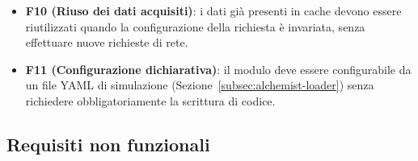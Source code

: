 \begin{itemize}
    \item \textbf{F10 (Riuso dei dati acquisiti)}: \label{req:F10} i dati già presenti in
    cache devono essere riutilizzati quando la configurazione della richiesta è invariata,
    senza effettuare nuove richieste di rete.

    \item \textbf{F11 (Configurazione dichiarativa)}: \label{req:F11} il modulo deve essere
    configurabile da un file YAML di simulazione (Sezione~\ref{subsec:alchemist-loader})
    senza richiedere obbligatoriamente la scrittura di codice.
\end{itemize}

\subsection{Requisiti non funzionali}
\label{subsec:requisiti-non-funzionali}

